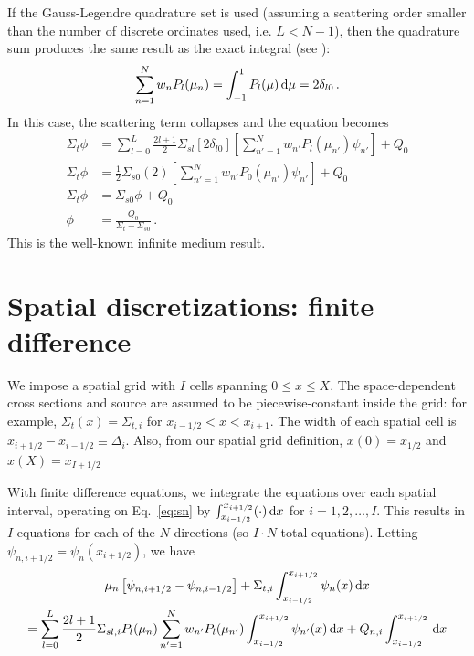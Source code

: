 \documentclass[]{SRJcommon}
\begin{document}
If the Gauss-Legendre quadrature set is used (assuming a scattering order
smaller than the number of discrete ordinates used, i.e. $L < N-1$),
then the quadrature sum
produces the same result as the exact integral (see \cite[p.121]{Lew1984}):
$$ \sum_{n=1}^{N} w_{n} P_{l}(\mu_n) 
= \int_{-1}^{1} P_l(\mu) \, \mathrm{d} \mu
= 2 \delta_{l0} \,.$$
In this case, the scattering term collapses and the equation becomes
\begin{align*}
  \Sigma_t \phi 
  &= \sum_{l=0}^{L}  \frac{2l+1}{2} \Sigma_{sl} \left[ 2 \delta_{l0} \right] \left[ \sum_{n'=1}^{N} w_{n'} P_{l} (\mu_{n'}) \psi_{n'}
\right] + Q_0
\\
  \Sigma_t \phi 
  &=  \frac{1}{2} \Sigma_{s0} (2) \left[ \sum_{n'=1}^{N} w_{n'} P_{0} (\mu_{n'}) \psi_{n'}
\right] + Q_0
\\
\Sigma_t \phi 
  &=  \Sigma_{s0} \phi + Q_0
\\
\phi 
&=  \frac{Q_0}{\Sigma_t - \Sigma_{s0}} \,.
\end{align*}
This is the well-known infinite medium result.
\section{Spatial discretizations: finite difference}
We impose a spatial grid with $I$ cells spanning $0 \le x \le X$. The
space-dependent cross sections and source are assumed to be piecewise-constant
inside the grid: for example, $\Sigma_t(x) = \Sigma_{t,i}$ for $x_{i-1/2} < x
< x_{i+1}$. The width of each spatial cell is $x_{i+1/2} - x_{i-1/2} \equiv
\Delta_i$. Also, from our spatial grid definition, $x(0) = x_{1/2}$ and $x(X) =
x_{I+1/2}$

With finite difference equations, we integrate the \SN{} equations over each
spatial interval, operating on Eq.~\eqref{eq:sn} by
$\int_{x_{i-1/2}}^{x_{i+1/2}} (\cdot) \, \mathrm{d} x$ for $i = 1,2,\ldots, I$.
This results in $I$ equations for each of the $N$ directions (so $I \cdot N$
total equations). Letting $\psi_{n,i+1/2} = \psi_n(x_{i+1/2})$, we have
\begin{multline}
  \mu_n \left[ \psi_{n,i+1/2} - \psi_{n,i-1/2} \right] + \Sigma_{t,i}
  \int_{x_{i-1/2}}^{x_{i+1/2}} \psi_n(x) \, \mathrm{d} x
\\
= \sum_{l=0}^{L}  \frac{2l+1}{2} \Sigma_{sl,i} P_{l}(\mu_n)
 \sum_{n'=1}^{N} w_{n'} P_{l} (\mu_{n'}) \int_{x_{i-1/2}}^{x_{i+1/2}} \psi_{n'}(x) \, \mathrm{d} x
  + Q_{n,i} \int_{x_{i-1/2}}^{x_{i+1/2}} \, \mathrm{d} x
  \label{eq:finitediff}
\end{multline}
\end{document}
